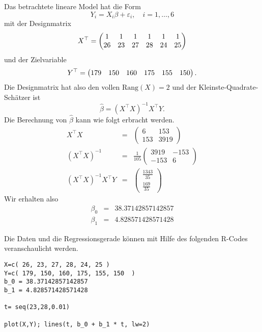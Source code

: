 \solution Das betrachtete lineare Model hat die Form
\begin{equation*}
    Y_i = X_i \beta + \varepsilon_i, \quad i=1,\ldots, 6
\end{equation*}
mit der Designmatrix
$$ X^\top = \left(\begin{matrix} 1&1&1&1&1&1\cr 26&23&27&28&24&25\cr \end{matrix} \right) $$
und der Zielvariable
\begin{equation*}
    Y^\top = \left( \begin{matrix} 179&150&160&175&155&150\cr   \end{matrix}  \right).
\end{equation*}
Die Designmatrix hat also den vollen $\textrm{Rang}(X)=2$ und der Kleinste-Quadrate-Schätzer
ist 
\begin{equation*}
    \hat \beta = \left( X^\top X \right)^{-1} X^\top Y.
\end{equation*}
Die Berechnung von $\hat \beta$ kann wie folgt erbracht werden. 
\begin{eqnarray*}
    X^\top X &=&  
    \left( {
    \begin{array}{cc}
        6 & 153 \\ 153 & 3919
    \end{array} }
    \right) \\
    \left(  X^\top X\right)^{-1} &=& \frac{1}{105} 
    \left( {
    \begin{array}{cc} 
        3919&-153 \\ -153&6
    \end{array} }
    \right) \\
    \left(  X^\top X\right)^{-1} X^\top Y &=& \left(
    \begin{array}{c}
        \frac{1343}{35} \\ \frac{169}{35}
    \end{array}
    \right)
\end{eqnarray*}
Wir erhalten also 
\begin{eqnarray*}
    \beta_0 &=&  38.37142857142857 \\
    \beta_1 &=&  4.828571428571428
\end{eqnarray*}

Die Daten und die Regressionsgerade können mit Hilfe des folgenden R-Codes veranschaulicht werden. 
\begin{lstlisting}
X=c( 26, 23, 27, 28, 24, 25 )
Y=c( 179, 150, 160, 175, 155, 150  )
b_0 = 38.37142857142857
b_1 = 4.828571428571428

t= seq(23,28,0.01)

plot(X,Y); lines(t, b_0 + b_1 * t, lw=2)
\end{lstlisting}


